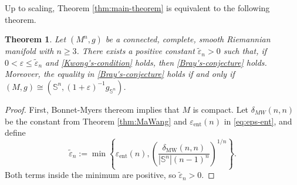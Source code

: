 \documentclass[11pt, reqno]{amsart}
\numberwithin{equation}{section}
\newtheorem{theorem}{Theorem}[section]
\theoremstyle{remark}
\newcommand{\Sph}{\mathbb S}
\newcommand{\eps}{\varepsilon}
\newcommand{\MW}{\mathrm{MW}}
\newcommand{\ent}{\mathrm{ent}}
\begin{document}
Up to scaling, Theorem \ref{thm:main-theorem} is equivalent to the following theorem.




\begin{theorem}
        Let $(M^n,g)$ be a connected, complete,  smooth Riemannian manifold with $n\geq 3$. There exists a positive constant $\tilde\varepsilon_n>0$ such that, if $0<\varepsilon\leq \tilde\varepsilon_n$ and \eqref{Kwong's-condition} holds,   then \eqref{Bray's-conjecture} holds. {Moreover, the equality in \eqref{Bray's-conjecture} holds if and only if $(M, g)\cong(\Sph^n, (1+\eps)^{-1}g_{\Sph^n})$.}
\end{theorem}
\begin{proof}
First, Bonnet-Myers thereom implies that $M$ is compact. 
Let $\delta_{MW}(n,n)$ be the constant from Theorem \ref{thm:MaWang} and $\varepsilon_{\ent}(n)$ in \eqref{eq:eps-ent}, and define
\begin{equation}\label{eq:epsilon-n-definition}
\tilde\varepsilon_n
:=\min\left\{
\varepsilon_{\ent}(n),
\left(
\frac{\delta_{\MW}(n,n)}{|\Sph^n|(n-1)^n}
\right)^{1/n}
\right\}.
\end{equation}
Both terms inside the minimum are positive, so $\tilde\eps_n>0$.



\end{proof}
\end{document}
